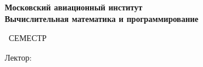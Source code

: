\begin{titlepage}
	\clearpage\thispagestyle{empty}
	\centering
	
	\textbf{Московский авиационный институт \\ Вычислительная математика и программирование}
	\vspace{33ex}
	
	{\textbf{\FullCourseName}}
	
	\SemesterNumber\ СЕМЕСТР
	\vspace{1ex}
	
	Лектор: \textit{\Lecturer}
\end{titlepage}